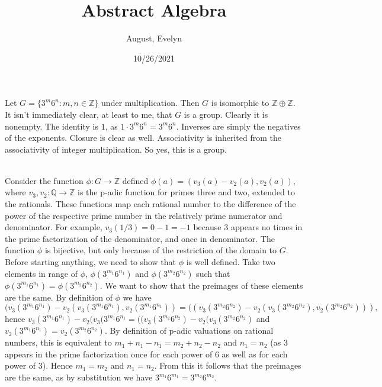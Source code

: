 \documentclass{article}
\title{Abstract Algebra}
\author{August, Evelyn}
\date{10/26/2021}
\newcommand{\Z}{\mathbb{Z}}
\newcommand{\Q}{\mathbb{Q}}
\begin{document}
\maketitle
 Let $G = \{3^m6^n:m,n\in \Z\}$ under multiplication. Then $G$ is isomorphic to $\Z\oplus\Z$.\\

 It isn't immediately clear, at least to me, that $G$ is a group. Clearly it is nonempty. The identity is $1$, as $1\cdot 3^m6^n = 3^m6^n$. Inverses are simply the negatives of the exponents. Closure is clear as well. Associativity is inherited from the associativity of integer multiplication. So yes, this is a group.

\\ Consider the function $\phi:G\rightarrow \Z$ defined $\phi(a) = (v_3(a)-v_2(a), v_2(a))$, where $v_3,v_2:\Q\rightarrow \Z$ is the p-adic function for primes three and two, extended to the rationals. These functions map each rational number to the difference of the power of the respective prime number in the relatively prime numerator and denominator. For example, $v_3(1/3) = 0 - 1 = -1 $ because 3 appears no times in the prime factorization of the denominator, and once in denominator. The function $\phi$ is bijective, but only because of the restriction of the domain to $G$.\\

Before starting anything, we need to show that $\phi$ is well defined. Take two elements in range of $\phi$, $\phi(3^{m_1}6^{n_1})$ and $\phi(3^{m_2}6^{n_2})$ such that $\phi(3^{m_1}6^{n_1}) = \phi(3^{m_2}6^{n_2})$. We want to show that the preimages of these elements are the same. By definition of $\phi$ we have $$(v_3(3^{m_1}6^{n_1}) - v_2(v_3(3^{m_1}6^{n_1}), v_2(3^{m_1}6^{n_1})) = ((v_3(3^{m_2}6^{n_2}) - v_2(v_3(3^{m_2}6^{n_2}), v_2(3^{m_2}6^{n_2}))),$$ hence
$v_3(3^{m_1}6^{n_1}) - v_2(v_3(3^{m_1}6^{n_1} = ((v_3(3^{m_2}6^{n_2}) - v_2(v_3(3^{m_2}6^{n_2})$ and $v_2(3^{m_1}6^{n_1}) = v_2(3^{m_2}6^{n_2}).$ By definition of p-adic valuations on rational numbers, this is equivalent to 
$m_1 + n_1 - n_1 = m_2+ n_2- n_2$ and $n_1 = n_2$ (as $3$ appears in the prime factorization once for each power of $6$ as well as for each power of $3$). Hence $m_1 = m_2$ and $n_1 = n_2$. From this it follows that the preimages are the same, as by substitution we have $3^{m_1}6^{m_1} = 3^{m_2}6^{m_2}$.
\end{document}
